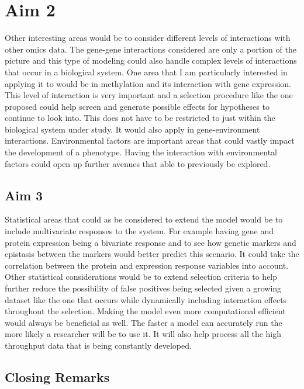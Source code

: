 \documentclass[11pt,]{book}
\theoremstyle{definition}
\theoremstyle{definition}
\theoremstyle{remark}
\begin{document}
\section{Aim 2}\label{aim-2}

Other interesting areas would be to consider different levels of
interactions with other omics data. The gene-gene interactions
considered are only a portion of the picture and this type of modeling
could also handle complex levels of interactions that occur in a
biological system. One area that I am particularly interested in
applying it to would be in methylation and its interaction with gene
expression. This level of interaction is very important and a selection
procedure like the one proposed could help screen and generate possible
effects for hypotheses to continue to look into. This does not have to
be restricted to just within the biological system under study. It would
also apply in gene-environment interactions. Environmental factors are
important areas that could vastly impact the development of a phenotype.
Having the interaction with environmental factors could open up further
avenues that able to previously be explored.

\subsection{Aim 3}\label{aim-3}

Statistical areas that could as be considered to extend the model would
be to include multivariate responses to the system. For example having
gene and protein expression being a bivariate response and to see how
genetic markers and epistasis between the markers would better predict
this scenario. It could take the correlation between the protein and
expression response variables into account. Other statistical
considerations would be to extend selection criteria to help further
reduce the possibility of false positives being selected given a growing
dataset like the one that occurs while dynamically including interaction
effects throughout the selection. Making the model even more
computational efficient would always be beneficial as well. The faster a
model can accurately run the more likely a researcher will be to use it.
It will also help process all the high throughput data that is being
constantly developed.

\subsection{Closing Remarks}\label{closing-remarks}
\end{document}
